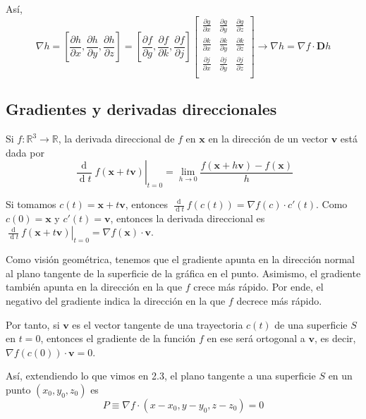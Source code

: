 \documentclass[a4paper]{article}
\newcommand{\dd}{\ensuremath{\operatorname{d}}}
\renewcommand{\d}[1]{\ensuremath{\operatorname{d}\!{#1}}}
\begin{document}
Así, 
\[\nabla h = \left[\frac{\partial h}{\partial x}, \frac{\partial h}{\partial y}, \frac{\partial h}{\partial z}\right] =  \left[\frac{\partial f}{\partial g}, \frac{\partial f}{\partial k}, \frac{\partial f}{\partial j}\right]  \left[\begin{matrix}
\frac{\partial g}{\partial x} & \frac{\partial g}{\partial y} & \frac{\partial g}{\partial z}\\
\frac{\partial k}{\partial x} & \frac{\partial k}{\partial y} & \frac{\partial k}{\partial z}\\
\frac{\partial j}{\partial x} & \frac{\partial j}{\partial y} & \frac{\partial j}{\partial z}\\
\end{matrix}\right] \rightarrow \nabla h = \nabla f \cdot \textbf{D}h \]


\subsection{Gradientes y derivadas direccionales}
Si $f:\mathbb{R}^3\rightarrow\mathbb{R}$, la derivada direccional de $f$ en $\textbf{x}$ en la dirección de un vector $\textbf{v}$ está dada por 
\[ \left.\frac{\dd}{\d t} f(\textbf{x} + t\textbf{v}) \right|_{t=0} = \lim_{h \rightarrow 0} \frac{f(\textbf{x} + h\textbf{v})-f(\textbf{x})}{h}\]

Si tomamos $c(t) = \textbf{x} + t\textbf{v}$, entonces $\frac{\dd}{\d t} f(c(t)) = \nabla f(c)\cdot c'(t)$. Como $c(0) = \textbf{x}$ y $c'(t) = \textbf{v}$, entonces la derivada direccional es $\left.\frac{\dd}{\d t} f(\textbf{x} + t\textbf{v}) \right|_{t=0} = \nabla f(\textbf{x})\cdot \textbf{v}$.

Como visión geométrica, tenemos que el gradiente apunta en la dirección normal al plano tangente de la superficie de la gráfica en el punto. Asimismo, el gradiente también apunta en la dirección en la que $f$ crece más rápido. Por ende, el negativo del gradiente indica la dirección en la que $f$ decrece más rápido. 

Por tanto, si $\textbf{v}$ es el vector tangente de una trayectoria $c(t)$ de una superficie $S$ en $t=0$, entonces el gradiente de la función $f$ en ese será ortogonal a $\textbf{v}$, es decir, $\nabla f(c(0)) \cdot \textbf{v} = 0$.

Así, extendiendo lo que vimos en 2.3, el plano tangente a una superficie $S$ en un punto $(x_0,y_0,z_0)$ es $$P \equiv \nabla f \cdot (x-x_0,y-y_0,z-z_0) = 0$$
\end{document}

